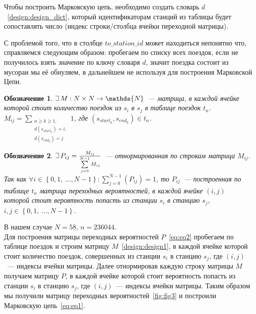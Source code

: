 \documentclass[specialist, substylefile = spbu_report.rtx, subf,href,colorlinks=true, 12pt]{disser}
\newtheorem{designation}{Обозначение}
\def\letus{%
	\mathord{\setbox0=\hbox{$\exists$}%
		\hbox{\kern 0.125\wd0%
			\vbox to \ht0{%
				\hrule width 0.75\wd0%
				\vfill%
				\hrule width 0.75\wd0}%
			\vrule height \ht0%
			\kern 0.125\wd0}%
	}%
}
\begin{document}
Чтобы построить Марковскую цепь, необходимо создать словарь $d$~\eqref{design:design_dict}, который идентификаторам станций из таблицы будет сопоставлять число (индекс строки/столбца ячейки переходной матрицы).

С проблемой того, что в столбце $to\_station\_id$ может находиться непонятно что, справляемся следующим образом: пробегаем по списку всех поездок, если не получилось взять значение по ключу словаря $d$, значит поездка состоит из \guillemotleft мусора\guillemotright и мы её обнуляем, в дальнейшем не используя для построения Марковской Цепи.

\begin{designation}\label{design:design1}
	$\letus \, M: N\times N \rightarrow \mathds{N}$~--- матрица, в каждой ячейке которой стоит количество поездок из $s_i$ в $s_j$ в таблице поездок $t_n$. \\
	$M_{ij} = \sum\limits_{\substack{n \geq k \geq 1, \\ d(s_{start_k}) = i, \\ d(s_{end_k}) = j}}{1}$, где $(s_{start_k}, s_{end_k}) \in t_n$.
\end{designation}

\begin{designation}\label{design:design2}
	$\letus \, P_{ij} = \frac{M_{ij}}{\sum\limits_{j = 0}^{N - 1}{M_{ij}}}$~--- отнормированная по строкам матрица $M_{ij}$.\\
	Так как $\forall i \in \left\{ 0, 1, \ \ldots, N - 1\right\}: \sum\limits_{j=0}^{N - 1}(P_{ij}) = 1$, то $P_{ij}$~--- построенная по таблице $t_n$ матрица переходных вероятностей, в каждой ячейке $(i, j)$ которой стоит вероятность попасть из станции $s_i$ в станцию $s_j$, $i, j \in \left\{ 0, 1, \ \ldots, N - 1\right\}$. 
\end{designation}

В нашем случае $N = 58$, $n = 236044$. \\
Для построения матрицы переходных вероятностей $P$~\eqref{eq:eq2} пробегаем по таблице поездок и строим матрицу $M$~\eqref{design:design1}, в каждой ячейке которой стоит количество поездок, совершенных из станции $s_i$ в станцию $s_j$, где $(i, j)$~--- индексы ячейки матрицы.
Далее отнормировав каждую строку матрицы $M$ получаем матрицу $P$, в каждой ячейке которой стоит вероятность попасть из станции $s_i$ в станцию $s_j$, где $(i, j)$~--- индексы ячейки матрицы. Таким образом мы получили матрицу переходных вероятностей~\eqref{fig:fig3} и построили Марковскую цепь~\eqref{eq:eq1}.
\end{document}
